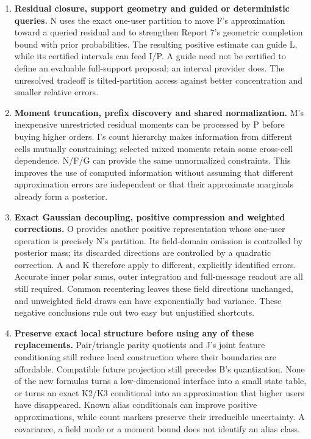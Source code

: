 \documentclass[10pt,a4paper]{article}
\begin{document}
\begin{enumerate}
\item \textbf{Residual closure, support geometry and guided or deterministic queries.}
      N uses the exact one-user partition to move F's approximation toward a queried residual and to
      strengthen Report 7's geometric completion bound with prior probabilities.
      The resulting positive estimate can guide L, while its certified intervals can feed I/P.
      A guide need not be certified to define an evaluable full-support proposal; an interval provider does.
      The unresolved tradeoff is tilted-partition access against better concentration and smaller relative errors.
\item \textbf{Moment truncation, prefix discovery and shared normalization.}
      M's inexpensive unrestricted residual moments can be processed by P before buying higher orders.
      I's count hierarchy makes information from different cells mutually constraining; selected mixed
      moments retain some cross-cell dependence. N/F/G can provide the same unnormalized constraints.
      This improves the use of computed information without assuming that different approximation errors
      are independent or that their approximate marginals already form a posterior.
\item \textbf{Exact Gaussian decoupling, positive compression and weighted corrections.}
      O provides another positive representation whose one-user operation is precisely N's partition.
      Its field-domain omission is controlled by posterior mass; its discarded directions are controlled
      by a quadratic correction. A and K therefore apply to different, explicitly identified errors.
      Accurate inner polar sums, outer integration and full-message readout are all still required.
      Common recentering leaves these field directions unchanged, and unweighted field draws can have
      exponentially bad variance. These negative conclusions rule out two easy but unjustified shortcuts.
\item \textbf{Preserve exact local structure before using any of these replacements.}
      Pair/triangle parity quotients and J's joint feature conditioning still reduce local construction
      where their boundaries are affordable. Compatible future projection still precedes B's quantization.
      None of the new formulas turns a low-dimensional interface into a small state table, or turns an
      exact K2/K3 conditional into an approximation that higher users have disappeared.
      Known alias conditionals can improve positive approximations, while count markers preserve their
      irreducible uncertainty. A covariance, a field mode or a moment bound does not identify an alias class.
\end{enumerate}
\end{document}
